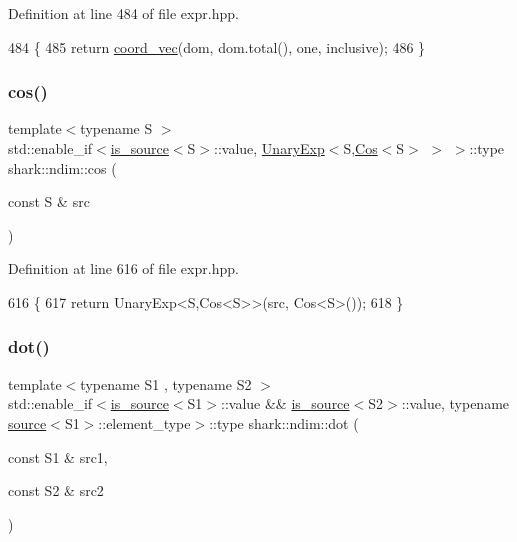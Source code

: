 Definition at line 484 of file expr.\+hpp.


\begin{DoxyCode}
484                                                                                                            
               \{
485             \textcolor{keywordflow}{return} \hyperlink{namespaceshark_1_1ndim_a6beec51528cef95c43479d8e4c378c99}{coord\_vec}(dom, dom.total(), one, inclusive);
486         \}
\end{DoxyCode}
\hypertarget{namespaceshark_1_1ndim_a5dfdad9111c53551d5b4a60d8d68820f}{}\label{namespaceshark_1_1ndim_a5dfdad9111c53551d5b4a60d8d68820f} 
\subsubsection{\texorpdfstring{cos()}{cos()}}
{\footnotesize\ttfamily template$<$typename S $>$ \\
std\+::enable\+\_\+if$<$\hyperlink{classshark_1_1ndim_1_1is__source}{is\+\_\+source}$<$S$>$\+::value, \hyperlink{classshark_1_1ndim_1_1_unary_exp}{Unary\+Exp}$<$S,\hyperlink{classshark_1_1ndim_1_1_cos}{Cos}$<$S$>$ $>$ $>$\+::type shark\+::ndim\+::cos (\begin{DoxyParamCaption}\item[{const S \&}]{src }\end{DoxyParamCaption})}



Definition at line 616 of file expr.\+hpp.


\begin{DoxyCode}
616                                                                                            \{
617             \textcolor{keywordflow}{return} UnaryExp<S,Cos<S>>(src, Cos<S>());
618         \}
\end{DoxyCode}
\hypertarget{namespaceshark_1_1ndim_a9b4a2fb83e2ac9ad876f4423fc6aa8bd}{}\label{namespaceshark_1_1ndim_a9b4a2fb83e2ac9ad876f4423fc6aa8bd} 
\subsubsection{\texorpdfstring{dot()}{dot()}}
{\footnotesize\ttfamily template$<$typename S1 , typename S2 $>$ \\
std\+::enable\+\_\+if$<$\hyperlink{classshark_1_1ndim_1_1is__source}{is\+\_\+source}$<$S1$>$\+::value \&\& \hyperlink{classshark_1_1ndim_1_1is__source}{is\+\_\+source}$<$S2$>$\+::value, typename \hyperlink{structshark_1_1ndim_1_1source}{source}$<$S1$>$\+::element\+\_\+type$>$\+::type shark\+::ndim\+::dot (\begin{DoxyParamCaption}\item[{const S1 \&}]{src1,  }\item[{const S2 \&}]{src2 }\end{DoxyParamCaption})}

